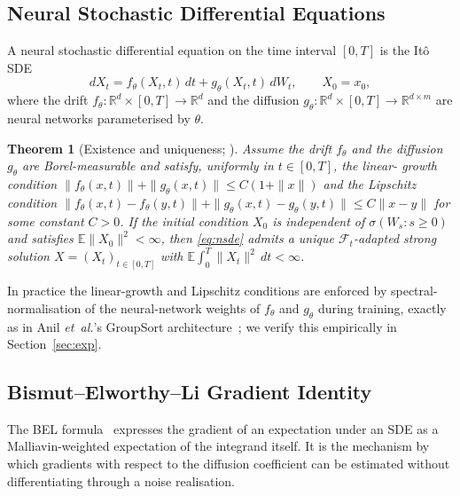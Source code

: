\documentclass[journal,10pt]{IEEEtran}
\newtheorem{theorem}{Theorem}
\theoremstyle{definition}
\theoremstyle{remark}
\newcommand{\Real}{\mathbb{R}}
\newcommand{\Exp}{\mathbb{E}}
\newcommand{\Fcal}{\mathcal{F}}
\begin{document}
\subsection{Neural Stochastic Differential Equations}\label{subsec:nsde}
A neural stochastic differential equation on the time interval
$[0,T]$ is the It\^o SDE
\begin{equation}\label{eq:nsde}
  dX_t = f_\theta(X_t,t)\,dt + g_\theta(X_t,t)\,dW_t,\qquad X_0=x_0,
\end{equation}
where the drift $f_\theta:\Real^d\!\times\![0,T]\!\to\!\Real^d$ and the
diffusion $g_\theta:\Real^d\!\times\![0,T]\!\to\!\Real^{d\times m}$
are neural networks parameterised by $\theta$.

\begin{theorem}[Existence and uniqueness; {\protect\cite[Thm.~5.2.1]{oksendal2003}}]\label{thm:eu}
Assume the drift $f_\theta$ and the diffusion $g_\theta$ are
Borel-measurable and satisfy, uniformly in $t\in[0,T]$, the linear-
growth condition
$\|f_\theta(x,t)\|+\|g_\theta(x,t)\|\leq C(1+\|x\|)$
and the Lipschitz condition
$\|f_\theta(x,t)-f_\theta(y,t)\|+\|g_\theta(x,t)-g_\theta(y,t)\|\leq C\|x-y\|$
for some constant $C>0$. If the initial condition $X_0$ is independent
of $\sigma(W_s:s\geq 0)$ and satisfies $\Exp\|X_0\|^2<\infty$, then
\eqref{eq:nsde} admits a unique $\Fcal_t$-adapted strong solution
$X=(X_t)_{t\in[0,T]}$ with
$\Exp\!\int_0^T\!\|X_t\|^2\,dt<\infty$.
\end{theorem}

In practice the linear-growth and Lipschitz conditions are enforced by
spectral-normalisation of the neural-network weights of $f_\theta$ and
$g_\theta$ during training, exactly as in Anil \textit{et~al.}'s
GroupSort architecture~\cite{anil2019sorting}; we verify this
empirically in Section~\ref{sec:exp}.

\subsection{Bismut--Elworthy--Li Gradient Identity}\label{subsec:bel}
The BEL formula~\cite{bismut1981martingales,elworthy1994formulae,hsu2002}
expresses the gradient of an expectation under an SDE as a
Malliavin-weighted expectation of the integrand itself. It is the
mechanism by which gradients with respect to the diffusion
coefficient can be estimated without differentiating through a noise
realisation.
\end{document}

